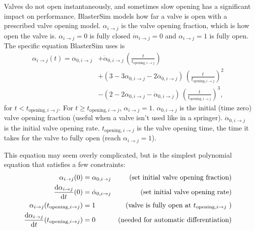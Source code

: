 Valves do not open instantaneously, and sometimes slow opening has a significant impact on performance.
BlasterSim models how far a valve is open with a prescribed valve opening model.
$\alpha_{i \rightarrow j}$ is the valve opening fraction, which is how open the valve is.
$\alpha_{i \rightarrow j} = 0$ is fully closed $\dot{m}_{i \rightarrow j} = 0$ and $\alpha_{i \rightarrow j} = 1$ is fully open.
The specific equation BlasterSim uses is
\begin{align}
    \alpha_{i \rightarrow j}(t) = \alpha_{0,i \rightarrow j}
    &+ \dot{\alpha}_{0,i \rightarrow j} \, \left(\frac{t}{t_{\text{opening},i \rightarrow j}}\right) \nonumber \\
    &+ (3 - 3 \alpha_{0,i \rightarrow j} - 2 \dot{\alpha}_{0,i \rightarrow j}) \, {\left(\frac{t}{t_{\text{opening},i \rightarrow j}}\right)}^2 \nonumber \\
    &- (2 - 2 \alpha_{0,i \rightarrow j} - \dot{\alpha}_{0,i \rightarrow j}) \, {\left(\frac{t}{t_{\text{opening},i \rightarrow j}}\right)}^3,
\end{align}
for $t < t_{\text{opening},i \rightarrow j}$. For $t \geq t_{\text{opening},i \rightarrow j}$, $\alpha_{i \rightarrow j} = 1$.
$\alpha_{0,i \rightarrow j}$ is the initial (time zero) valve opening fraction (useful when a valve isn't used like in a springer).
$\dot{\alpha}_{0,i \rightarrow j}$ is the initial valve opening rate.
$t_{\text{opening},i \rightarrow j}$ is the valve opening time, the time it takes for the valve to fully open (reach $\alpha_{i \rightarrow j} = 1$).

This equation may seem overly complicated, but is the simplest polynomial equation that satisfies a few constraints:
\begin{align}
    \alpha_{i \rightarrow j}(0)                                            &= \alpha_{0,i \rightarrow j} &\text{(set initial valve opening fraction)} \\
    {\dv{\alpha_{i \rightarrow j}}{t}}(0)                                  &= \dot{\alpha}_{0,i \rightarrow j} &\text{(set initial valve opening rate)} \\
    \alpha_{i \rightarrow j}(t_{\text{opening},i \rightarrow j})           &= 1 &\text{(valve is fully open at}~t_{\text{opening},i \rightarrow j}~\text{)} \\ %
    {\dv{\alpha_{i \rightarrow j}}{t}}(t_{\text{opening},i \rightarrow j}) &= 0 &\text{(needed for automatic differentiation)} \label{eq:derivative matching}
\end{align}

